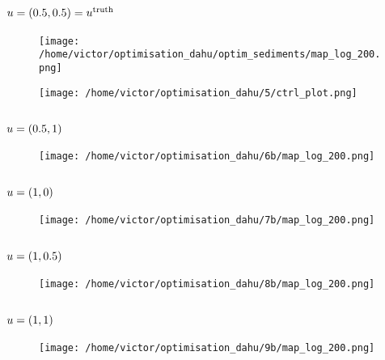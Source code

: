 \documentclass[../../Main_ManuscritThese.tex]{subfiles}
\begin{document}
\subsection*{$u=(0.5, 0.5) = u^{\mathrm{truth}}$}
\begin{figure}[ht]
  \centering
  \texttt{[image: /home/victor/optimisation\_dahu/optim\_sediments/map\_log\_200.png]}
\end{figure}
\begin{figure}[ht]
  \centering
  \texttt{[image: /home/victor/optimisation\_dahu/5/ctrl\_plot.png]}
\end{figure}
\clearpage
\subsection*{$u=(0.5, 1)$}
\begin{figure}[ht]
  \centering
  \texttt{[image: /home/victor/optimisation\_dahu/6b/map\_log\_200.png]}
\end{figure}
\begin{figure}[ht]
  \centering
    \resizebox{1\textwidth}{!}{}
\end{figure}
\clearpage
\subsection*{$u=(1, 0)$}

\begin{figure}[ht]
  \centering
  \texttt{[image: /home/victor/optimisation\_dahu/7b/map\_log\_200.png]}
\end{figure}
\begin{figure}[ht]
  \centering
  \resizebox{1\textwidth}{!}{}
\end{figure}
\clearpage
\subsection*{$u=(1, 0.5)$}
\begin{figure}[ht]
  \centering
  \texttt{[image: /home/victor/optimisation\_dahu/8b/map\_log\_200.png]}
\end{figure}
\begin{figure}[ht]
  \centering
    \resizebox{1\textwidth}{!}{}
\end{figure}
\clearpage
\subsection*{$u=(1, 1)$}
\begin{figure}[ht]
  \centering
  \texttt{[image: /home/victor/optimisation\_dahu/9b/map\_log\_200.png]}
\end{figure}
\begin{figure}[ht]
  \centering
  \resizebox{1\textwidth}{!}{}
\end{figure}
\clearpage
\end{document}

